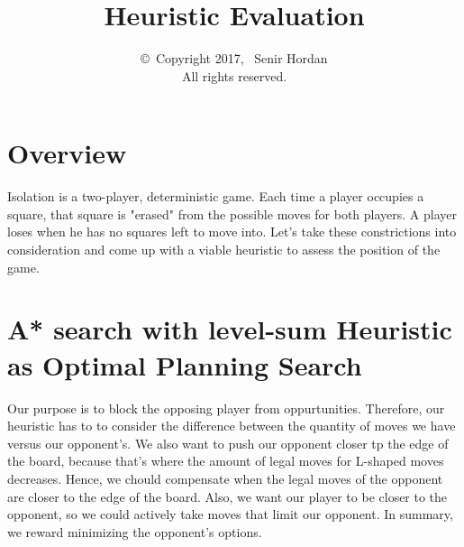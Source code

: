 \documentclass[11pt,a4paper]{report}
\begin{document}
\title{Heuristic Evaluation}
\author{\copyright~Copyright 2017, \ Senir Hordan\\
   All rights reserved.}
\maketitle


\section*{Overview}
Isolation is a two-player, deterministic game. Each time a player occupies a square, that square is "erased" from the possible moves for both players.  A player loses when he has no squares left to move into. Let's take these constrictions into consideration and come up with a viable heuristic to assess the position of the game.

\section*{A* search with level-sum Heuristic as Optimal Planning Search}
Our purpose is to block the opposing player from oppurtunities. Therefore, our heuristic has to to consider the difference between the quantity of moves we have versus our opponent's. We also want to push our opponent closer tp the edge of the board, because that's where the amount of legal moves for L-shaped moves decreases. 
Hence, we chould compensate when the legal moves of the opponent are closer to the edge of the board.   Also, we want our player to be closer to the opponent, so we could actively take moves that limit our opponent. In summary, we reward minimizing the opponent's options.
\end{document}
